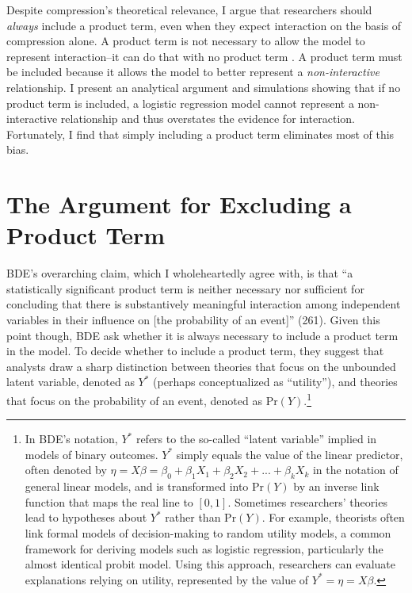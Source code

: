 \documentclass[12pt]{article}
\begin{document}
Despite compression's theoretical relevance, I argue that researchers should \textit{always} include a product term, even when they expect interaction on the basis of compression alone. A product term is not necessary to allow the model to represent interaction--it can do that with no product term \citep{BerryDeMerittEsarey2010}. A product term must be included because it allows the model to better represent a \textit{non-interactive} relationship. I present an analytical argument and simulations showing that if no product term is included, a logistic regression model cannot represent a non-interactive relationship and thus overstates the evidence for interaction. Fortunately, I find that simply including a product term eliminates most of this bias.
 
\section*{The Argument for Excluding a Product Term}

BDE's overarching claim, which I wholeheartedly agree with, is that ``a statistically significant product term is neither necessary nor sufficient for concluding that there is substantively meaningful interaction among independent variables in their influence on [the probability of an event]'' (261). Given this point though, BDE ask whether it is always necessary to include a product term in the model. To decide whether to include a product term, they suggest that analysts draw a sharp distinction between theories that focus on the unbounded latent variable, denoted as $Y^*$ (perhaps conceptualized as ``utility''), and theories that focus on the probability of an event, denoted as $\text{Pr}(Y)$.\footnote{In BDE's notation, $Y^*$ refers to the so-called ``latent variable'' implied in models of binary outcomes. $Y^*$ simply equals the value of the linear predictor, often denoted by $\eta = X\beta = \beta_0 + \beta_1X_1 + \beta_2X_2 + ... + \beta_kX_k$ in the notation of general linear models, and is transformed into $\text{Pr}(Y)$ by an inverse link function that maps the real line to $[0, 1]$. Sometimes researchers' theories lead to hypotheses about $Y^*$ rather than $\text{Pr}(Y)$. For example, theorists often link formal models of decision-making to random utility models, a common framework for deriving models such as logistic regression, particularly the almost identical probit model. Using this approach, researchers can evaluate explanations relying on utility, represented by the value of $Y^* = \eta = X\beta$.}
\end{document}
